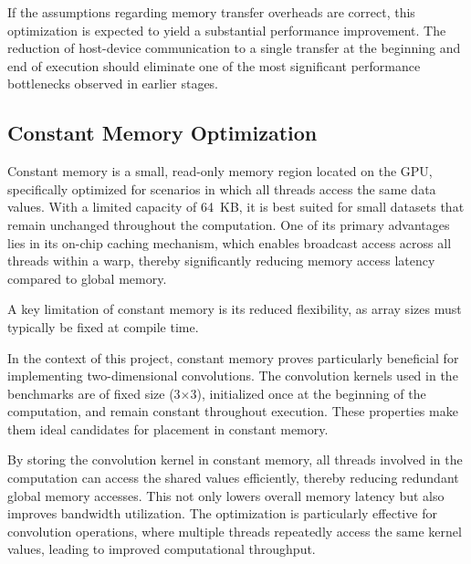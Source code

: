 \documentclass[modern,longauthor]{aastex7}
\begin{document}
If the assumptions regarding memory transfer overheads are correct, this optimization is expected to yield a substantial performance improvement. The reduction of host-device communication to a single transfer at the beginning and end of execution should eliminate one of the most significant performance bottlenecks observed in earlier stages.
\subsection{Constant Memory Optimization}\label{subsec:cuda-constant-memory}
Constant memory is a small, read-only memory region located on the GPU, specifically optimized for scenarios in which all threads access the same data values. With a limited capacity of 64~KB, it is best suited for small datasets that remain unchanged throughout the computation. One of its primary advantages lies in its on-chip caching mechanism, which enables broadcast access across all threads within a warp, thereby significantly reducing memory access latency compared to global memory.

A key limitation of constant memory is its reduced flexibility, as array sizes must typically be fixed at compile time.

In the context of this project, constant memory proves particularly beneficial for implementing two-dimensional convolutions. The convolution kernels used in the benchmarks are of fixed size (3$\times$3), initialized once at the beginning of the computation, and remain constant throughout execution. These properties make them ideal candidates for placement in constant memory.

By storing the convolution kernel in constant memory, all threads involved in the computation can access the shared values efficiently, thereby reducing redundant global memory accesses. This not only lowers overall memory latency but also improves bandwidth utilization. The optimization is particularly effective for convolution operations, where multiple threads repeatedly access the same kernel values, leading to improved computational throughput.
\end{document}

